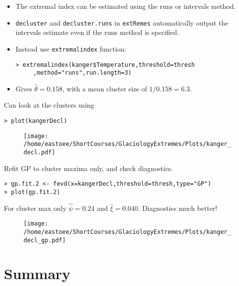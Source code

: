 \documentclass[dvipsnames]{beamer}
\begin{document}
\begin{frame}[fragile]
\begin{itemize}
\item
The extremal index can be estimated using the runs or intervals method. 
\item
\texttt{decluster} and \texttt{decluster.runs} in \texttt{extRemes} automatically output the intervals estimate even if the runs method is specified. 
\item
Instead use \texttt{extremalindex} function:
\begin{verbatim}
> extremalindex(kanger$Temperature,threshold=thresh
     ,method="runs",run.length=3)
\end{verbatim}
\item
Gives $\hat\theta=0.158$, with a mean cluster size of $1/0.158 =6.3$.
\end{itemize}
\end{frame}

\begin{frame}[fragile]
Can look at the clusters using 
\begin{verbatim}
> plot(kangerDecl)
\end{verbatim}
\begin{figure}
\centering
{\texttt{[image: /home/eastoee/ShortCourses/GlaciologyExtremes/Plots/kanger\_decl.pdf]}}
\end{figure}
\end{frame}

\begin{frame}[fragile]
Refit GP to cluster maxima only, and check diagnostics.
\begin{verbatim}
> gp.fit.2 <- fevd(x=kangerDecl,threshold=thresh,type="GP")
> plot(gp.fit.2)
\end{verbatim}
For cluster max only $\hat\psi=0.24$ and $\hat\xi=0.040$. Diagnostics much better!
\begin{figure}
\centering
{\texttt{[image: /home/eastoee/ShortCourses/GlaciologyExtremes/Plots/kanger\_decl\_gp.pdf]}}
\end{figure}
\end{frame}


\section{Summary}
\end{document}
